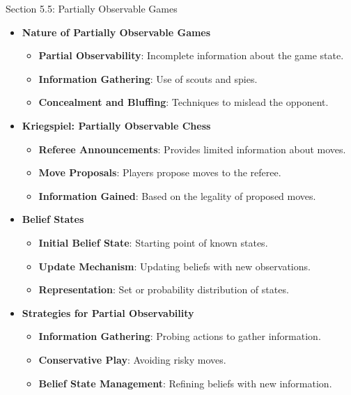 \begin{notes}{Section 5.5: Partially Observable Games}
\begin{highlight}
        \begin{itemize}
            \item \textbf{Nature of Partially Observable Games}
                \begin{itemize}
                    \item \textbf{Partial Observability}: Incomplete information about the game state.
                    \item \textbf{Information Gathering}: Use of scouts and spies.
                    \item \textbf{Concealment and Bluffing}: Techniques to mislead the opponent.
                \end{itemize}
            \item \textbf{Kriegspiel: Partially Observable Chess}
                \begin{itemize}
                    \item \textbf{Referee Announcements}: Provides limited information about moves.
                    \item \textbf{Move Proposals}: Players propose moves to the referee.
                    \item \textbf{Information Gained}: Based on the legality of proposed moves.
                \end{itemize}
            \item \textbf{Belief States}
                \begin{itemize}
                    \item \textbf{Initial Belief State}: Starting point of known states.
                    \item \textbf{Update Mechanism}: Updating beliefs with new observations.
                    \item \textbf{Representation}: Set or probability distribution of states.
                \end{itemize}
            \item \textbf{Strategies for Partial Observability}
                \begin{itemize}
                    \item \textbf{Information Gathering}: Probing actions to gather information.
                    \item \textbf{Conservative Play}: Avoiding risky moves.
                    \item \textbf{Belief State Management}: Refining beliefs with new information.
                \end{itemize}
        \end{itemize}
    \end{highlight}
\end{notes}